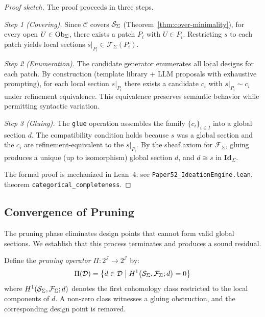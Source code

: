 \documentclass[11pt]{article}
\newcommand{\IdeationSpace}{\mathcal{I}}
\begin{document}
\begin{proof}[Proof sketch]
The proof proceeds in three steps.

\emph{Step 1 (Covering).}
Since $\mathcal{C}$ covers $\mathcal{S}_\Sigma$ (Theorem~\ref{thm:cover-minimality}),
for every open $U \in \mathrm{Ob}_\Sigma$, there exists a patch $P_i$ with
$U \in P_i$.  Restricting $s$ to each patch yields local sections
$s|_{P_i} \in \mathcal{F}_\Sigma(P_i)$.

\emph{Step 2 (Enumeration).}
The candidate generator enumerates all local designs for each patch.
By construction (template library + LLM proposals with exhaustive
prompting), for each local section $s|_{P_i}$ there exists a candidate
$c_i$ with $s|_{P_i} \sim c_i$ under refinement equivalence.  This
equivalence preserves semantic behavior while permitting syntactic
variation.

\emph{Step 3 (Gluing).}
The \texttt{glue} operation assembles the family $\{c_i\}_{i \in I}$
into a global section $d$.  The compatibility condition holds because
$s$ was a global section and the $c_i$ are refinement-equivalent to
the $s|_{P_i}$.  By the sheaf axiom for $\mathcal{F}_\Sigma$,
gluing produces a unique (up to isomorphism) global section $d$,
and $d \cong s$ in $\mathbf{Id}_\Sigma$.

The formal proof is mechanized in Lean~4: see
\texttt{Paper52\_IdeationEngine.lean}, theorem
\texttt{categorical\_completeness}.
\end{proof}

\subsection{Convergence of Pruning}

The pruning phase eliminates design points that cannot form valid global
sections.  We establish that this process terminates and produces a
sound residual.

\begin{definition}\label{def:pruning-op}
Define the \emph{pruning operator} $\Pi\colon 2^{\IdeationSpace} \to
2^{\IdeationSpace}$ by:
\[
  \Pi(\mathcal{D}) = \bigl\{ d \in \mathcal{D} \;\big|\;
  H^{1}\bigl(\mathcal{S}_\Sigma, \mathcal{F}_\Sigma;
  d\bigr) = 0 \bigr\}
\]
where $H^{1}(\mathcal{S}_\Sigma, \mathcal{F}_\Sigma; d)$ denotes the
first cohomology class restricted to the local components of $d$.
A non-zero class witnesses a gluing obstruction, and the corresponding
design point is removed.
\end{definition}
\end{document}
